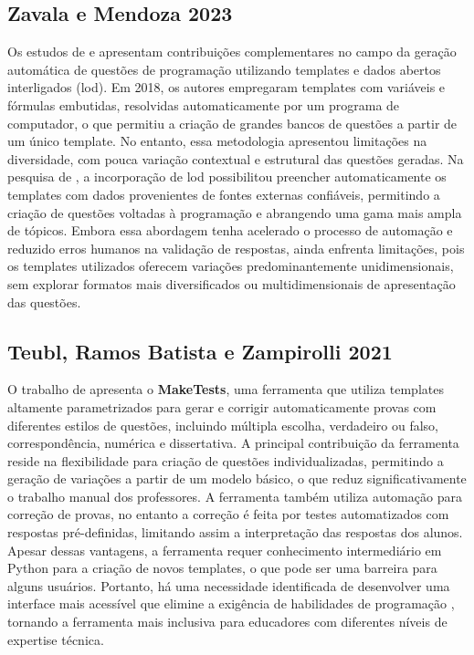 \subsection{Zavala e Mendoza 2023}

Os estudos de \parencite{zalava2018} e   \parencite{zalava2023}  apresentam contribuições complementares no campo da geração automática de questões de programação utilizando templates e dados abertos interligados (\gls{lod}). Em 2018, os autores empregaram templates com variáveis e fórmulas embutidas, resolvidas automaticamente por um programa de computador, o que permitiu a criação de grandes bancos de questões a partir de um único template. No entanto, essa metodologia apresentou limitações na diversidade, com pouca variação contextual e estrutural das questões geradas. Na pesquisa de \cite{zalava2023}, a incorporação de \gls{lod} possibilitou preencher automaticamente os templates com dados provenientes de fontes externas confiáveis, permitindo a criação de questões voltadas à programação e abrangendo uma gama mais ampla de tópicos. Embora essa abordagem tenha acelerado o processo de automação e reduzido erros humanos na validação de respostas, ainda enfrenta limitações, pois os templates utilizados oferecem variações predominantemente unidimensionais, sem explorar formatos mais diversificados ou multidimensionais de apresentação das questões.

 \subsection{Teubl, Ramos Batista e Zampirolli 2021}
O trabalho de \parencite{teubl2021}  apresenta o \textbf{MakeTests}, uma ferramenta que utiliza templates altamente parametrizados para gerar e corrigir automaticamente provas com diferentes estilos de questões, incluindo múltipla escolha, verdadeiro ou falso, correspondência, numérica e dissertativa. A principal contribuição da ferramenta reside na flexibilidade para criação de questões individualizadas, permitindo a geração de variações a partir de um modelo básico, o que reduz significativamente o trabalho manual dos professores.  A ferramenta também utiliza automação para correção de provas, no entanto a correção é feita por testes automatizados com respostas pré-definidas, limitando assim a interpretação das respostas dos alunos. Apesar dessas vantagens, a ferramenta requer conhecimento intermediário em Python para a criação de novos templates, o que pode ser uma barreira para alguns usuários. Portanto, há uma necessidade identificada de desenvolver uma interface mais acessível que elimine a exigência de habilidades de programação , tornando a ferramenta mais inclusiva para educadores com diferentes níveis de expertise técnica. 

